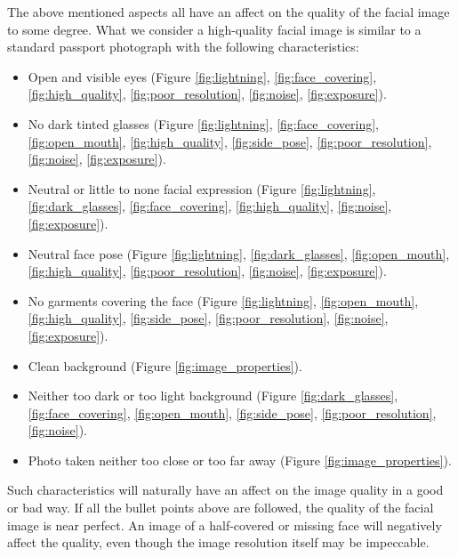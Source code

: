 The above mentioned aspects all have an affect on the quality of the facial image to some degree. What we consider a high-quality facial image is similar to a standard passport photograph with the following characteristics: 
%
\begin{itemize}
\label{item:passport}
    \item Open and visible eyes (Figure \ref{fig:lightning}, \ref{fig:face_covering}, \ref{fig:high_quality}, \ref{fig:poor_resolution}, \ref{fig:noise}, \ref{fig:exposure}).
    \item No dark tinted glasses (Figure \ref{fig:lightning}, \ref{fig:face_covering}, \ref{fig:open_mouth}, \ref{fig:high_quality}, \ref{fig:side_pose}, \ref{fig:poor_resolution}, \ref{fig:noise}, \ref{fig:exposure}). 
    \item Neutral or little to none facial expression (Figure \ref{fig:lightning}, \ref{fig:dark_glasses}, \ref{fig:face_covering}, \ref{fig:high_quality}, \ref{fig:noise}, \ref{fig:exposure}).
    \item Neutral face pose (Figure \ref{fig:lightning}, \ref{fig:dark_glasses}, \ref{fig:open_mouth}, \ref{fig:high_quality}, \ref{fig:poor_resolution}, \ref{fig:noise}, \ref{fig:exposure}).
    \item No garments covering the face (Figure \ref{fig:lightning}, \ref{fig:open_mouth}, \ref{fig:high_quality}, \ref{fig:side_pose}, \ref{fig:poor_resolution}, \ref{fig:noise}, \ref{fig:exposure}). 
    \item Clean background (Figure \ref{fig:image_properties}).
    \item Neither too dark or too light background (Figure \ref{fig:dark_glasses}, \ref{fig:face_covering}, \ref{fig:open_mouth}, \ref{fig:side_pose}, \ref{fig:poor_resolution}, \ref{fig:noise}).
    \item Photo taken neither too close or too far away (Figure \ref{fig:image_properties}).
\end{itemize} 
%
Such characteristics will naturally have an affect on the image quality in a good or bad way. If all the bullet points above are followed, the quality of the facial image is near perfect. An image of a half-covered or missing face will negatively affect the quality, even though the image resolution itself may be impeccable. 
